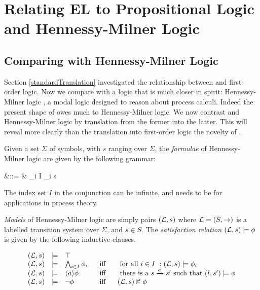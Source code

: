 
\section{Relating EL to Propositional Logic and Hennessy-Milner Logic}\label{relatingELToOtherLogics}

\subsection{Comparing \Cathoristic{} with Hennessy-Milner Logic}

Section \ref{standardTranslation} investigated the relationship
between \cathoristic{} and first-order logic. Now we compare \cathoristic{} with a
logic that is much closer in spirit: Hennessy-Milner logic
\cite{HennessyM:alglawfndac}, a modal logic designed to reason about
process calculi. Indeed the present shape of \cathoristic{} owes much to
Hennessy-Milner logic. We now contrast \cathoristic{} and Hennessy-Milner
logic by translation from the former into the latter.  This will
reveal more clearly than the translation into first-order logic the
novelty of \cathoristic{}.

Given a set $\Sigma$ of symbols, with $s$ ranging over
$\Sigma$, the \emph{formulae} of Hennessy-Milner logic are given
by the following grammar:
\begin{GRAMMAR}
  \phi 
     &\quad ::= \quad & 
  \top \fOr \BIGAND_{i \in I} \phi_i  \fOr \langle s \rangle \phi \fOr \neg \phi 
\end{GRAMMAR}

\NI The index set $I$ in the conjunction can be infinite, and needs to
be for applications in process theory.

 \emph{Models} of Hennessy-Milner logic are simply pairs $(\mathcal{L}, s)$
 where $\mathcal{L} = (S, \rightarrow)$ is a labelled transition system over
 $\Sigma$, and $s \in S$.  The \emph{satisfaction relation} $(\mathcal{L}, s)
 \models \phi$ is given by the following inductive clauses.

\[
\begin{array}{lclcl}
  (\mathcal{L}, s) 
     & \models & 
  \top  \\
  (\mathcal{L}, s) 
     & \models & 
  \bigwedge_{i \in I} \phi_i  &\  \mbox{ iff }\  & \mbox { for all $i \in I$ }: (\mathcal{L}, s) \models \phi_i  \\
  (\mathcal{L}, s) 
     & \models & 
  \langle a \rangle \phi & \mbox{ iff } & \mbox{ there is a } s \xrightarrow{a} s' \mbox { such that } (l,s') \models \phi  \\
  (\mathcal{L}, s) 
     & \models & 
  \neg \phi & \mbox{ iff } & (\mathcal{L}, s)  \nvDash \phi 
\end{array}
\]


